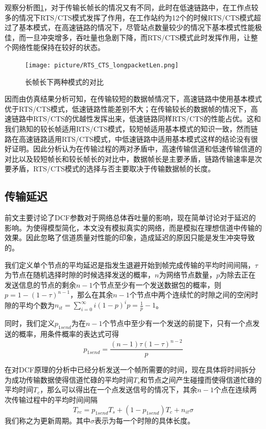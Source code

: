 \documentclass{article}
\begin{document}
观察分析图\ref{fig:RTS_CTS_longpacketLen}，对于传输长帧长的情况又有不同，此时在低速链路中，在工作点较多的情况下RTS/CTS模式发挥了作用，在工作站约为12个的时候RTS/CTS模式超过了基本模式，在高速链路的情况下，尽管站点数量较少的情况下基本模式性能极佳，而一旦冲突增多，吞吐量也急剧下降，而RTS/CTS模式此时发挥作用，让整个网络性能保持在较好的状态。

\begin{figure}[ht]
	\centering
	\texttt{[image: picture/RTS\_CTS\_longpacketLen.png]}
	\caption{长帧长下两种模式的对比}
	\label{fig:RTS_CTS_longpacketLen}
\end{figure}

因而由仿真结果分析可知，在传输较短的数据帧情况下，高速链路中使用基本模式优于RTS/CTS模式，低速链路性能差别不大；在传输较长的数据帧的情况下，高速链路中RTS/CTS的优越性发挥出来，低速链路同样RTS/CTS的性能占优。这和我们熟知的较长帧适用RTS/CTS模式，较短帧适用基本模式的知识一致，然而链路在高速链路适用RTS/CTS模式，中低速链路中适用基本模式这样的结论\cite{1}没有很好证明。因此分析认为在传输过程的两对矛盾中，高速传输信道和低速传输信道的对比以及较短帧长和较长帧长的对比中，数据帧长是主要矛盾，链路传输速率是次要矛盾，RTS/CTS模式的选择与否主要取决于传输数据帧的长度。

\subsection{传输延迟}
前文主要讨论了DCF参数对于网络总体吞吐量的影响，现在简单讨论对于延迟的影响。为使得模型简化，本文没有模拟真实的网络，而是模拟在理想信道中传输的效果。因此忽略了信道质量对性能的印象，造成延迟的原因只能是发生冲突导致的。

我们定义单个节点的平均延迟是指发生退避开始到帧完成传输的平均时间间隔，$\tau$为节点在随机选择时隙的时候选择发送的概率，$n$为网络节点数量，$p$为除去正在发送信息的节点的剩余$n-1$个节点至少有一个发送数据包的概率，则$p=1-(1-\tau )^{n-1}$，那么在其余$n-1$个节点中两个连续忙的时隙之间的空闲时隙的平均个数为$n_{it}=\sum_{i=0}^{\infty}{i(1-p)^{i}p}=\frac{1}{p}-1$。

同时，我们定义$p_{1send}$为在$n-1$个节点中至少有一个发送的前提下，只有一个点发送的概率，用条件概率的表达式可得
\begin{equation}
p_{1send}=\frac{(n-1)\tau(1-\tau)^{n-2}}{p}
\end{equation}

在对DCF原理的分析中已经分析发送一个帧所需要的时间，现在具体将时间拆分为成功传输数据使得信道忙碌的平均时间$T_{s}$和节点之间产生碰撞而使得信道忙碌的平均时间$T_{c}$，那么可以得出在一个点发送信号的情况下，其余$n-1$个点在连续两次传输过程中的平均时间间隔
\begin{equation}
T_{rc}=p_{1send}T_{s}+(1-p_{1send})T_{c}+n_{it}\sigma
\end{equation}
我们称之为更新周期。其中$\sigma$表示为每一个时隙的具体长度。
\end{document}
